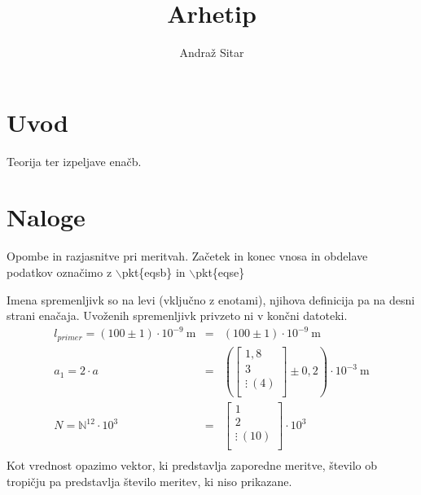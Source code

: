 \documentclass[12pt,a4paper]{article}
\title{Arhetip}
\author{Andraž Sitar}
\date{}
\begin{document}
\maketitle

\tableofcontents
\pagebreak

\section{Uvod}
Teorija ter izpeljave enačb.
\pagebreak
\section{Naloge}
Opombe in razjasnitve pri meritvah. Začetek in konec vnosa in obdelave podatkov označimo z $\backslash$pkt\{eqsb\} in $\backslash$pkt\{eqse\}

Imena spremenljivk so na levi (vključno z enotami), njihova definicija pa na desni strani enačaja. Uvoženih spremenljivk privzeto ni v končni datoteki.
\begin{eqnarray*}
	l_{primer}	 =  \left(100 \pm 1\right) \cdot 10^{-9} \ \mathrm{m}&=& \left( 100 \pm 1 \right) \cdot 10^{-9}\ \mathrm{m}\\ 
	a_{1}	 =  2 \cdot a &=& \left( \begin{bmatrix}1,8 \\3 \\\vdots\ (4) \\\end{bmatrix} \pm 0,2 \right) \cdot 10^{-3}\ \mathrm{m}\\ 
	N	 =  \mathbb{N}^{12} \cdot 10^{3} &=& \begin{bmatrix}1 \\2 \\\vdots\ (10) \\\end{bmatrix} \cdot 10^{3}\\ 
\end{eqnarray*}
Kot vrednost opazimo vektor, ki predstavlja zaporedne meritve, število ob tropičju pa predstavlja število meritev, ki niso prikazane.
\\
\end{document}
